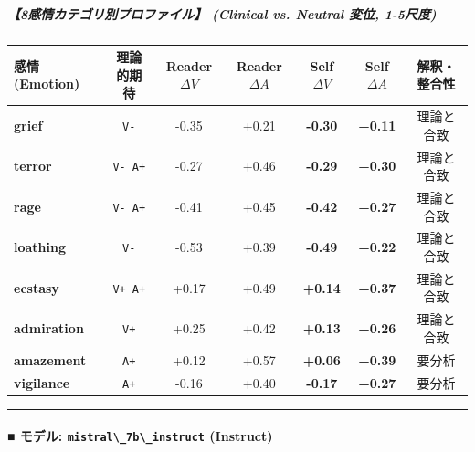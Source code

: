 \subparagraph{【8感情カテゴリ別プロファイル】 (Clinical vs. Neutral 変位, 1-5尺度)}
\begin{center}
\small
\begin{tabular}{lcccccc}
\toprule
\textbf{感情 (Emotion)} & \textbf{理論的期待} & \textbf{Reader $\Delta V$} & \textbf{Reader $\Delta A$} & \textbf{Self $\Delta V$} & \textbf{Self $\Delta A$} & \textbf{解釈・整合性} \\
\midrule
\textbf{grief} & \texttt{V-} & -0.35 & +0.21 & \textbf{-0.30} & \textbf{+0.11} & 理論と合致 \\
\textbf{terror} & \texttt{V- A+} & -0.27 & +0.46 & \textbf{-0.29} & \textbf{+0.30} & 理論と合致 \\
\textbf{rage} & \texttt{V- A+} & -0.41 & +0.45 & \textbf{-0.42} & \textbf{+0.27} & 理論と合致 \\
\textbf{loathing} & \texttt{V-} & -0.53 & +0.39 & \textbf{-0.49} & \textbf{+0.22} & 理論と合致 \\
\textbf{ecstasy} & \texttt{V+ A+} & +0.17 & +0.49 & \textbf{+0.14} & \textbf{+0.37} & 理論と合致 \\
\textbf{admiration} & \texttt{V+} & +0.25 & +0.42 & \textbf{+0.13} & \textbf{+0.26} & 理論と合致 \\
\textbf{amazement} & \texttt{A+} & +0.12 & +0.57 & \textbf{+0.06} & \textbf{+0.39} & 要分析 \\
\textbf{vigilance} & \texttt{A+} & -0.16 & +0.40 & \textbf{-0.17} & \textbf{+0.27} & 要分析 \\
\bottomrule
\end{tabular}
\end{center}


\vspace{0.5em}\hrule\vspace{0.5em}

\paragraph{■ モデル: \texttt{mistral\textbackslash{}\_7b\textbackslash{}\_instruct} (Instruct)}


